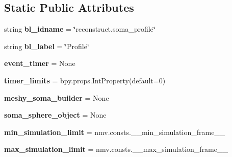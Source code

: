 \subsection*{Static Public Attributes}
\begin{DoxyCompactItemize}
\item 
string {\bfseries bl\+\_\+idname} = \char`\"{}reconstruct.\+soma\+\_\+profile\char`\"{}\hypertarget{classui__soft__body__panel_1_1ReconstructSomaProfile_a96e245e3b980b5d0f45db69df75bc9a7}{}\label{classui__soft__body__panel_1_1ReconstructSomaProfile_a96e245e3b980b5d0f45db69df75bc9a7}

\item 
string {\bfseries bl\+\_\+label} = \char`\"{}Profile\char`\"{}\hypertarget{classui__soft__body__panel_1_1ReconstructSomaProfile_ae5d9a1cb040df4826904c44fd276bf5f}{}\label{classui__soft__body__panel_1_1ReconstructSomaProfile_ae5d9a1cb040df4826904c44fd276bf5f}

\item 
{\bfseries event\+\_\+timer} = None\hypertarget{classui__soft__body__panel_1_1ReconstructSomaProfile_ae50a7f97e9bf86df3853a387cab031e6}{}\label{classui__soft__body__panel_1_1ReconstructSomaProfile_ae50a7f97e9bf86df3853a387cab031e6}

\item 
{\bfseries timer\+\_\+limits} = bpy.\+props.\+Int\+Property(default=0)\hypertarget{classui__soft__body__panel_1_1ReconstructSomaProfile_a1279d0aa730c1a5207c87ef6f68d97c1}{}\label{classui__soft__body__panel_1_1ReconstructSomaProfile_a1279d0aa730c1a5207c87ef6f68d97c1}

\item 
{\bfseries meshy\+\_\+soma\+\_\+builder} = None\hypertarget{classui__soft__body__panel_1_1ReconstructSomaProfile_aad5cdeed55ee9868a31d4f3d24906383}{}\label{classui__soft__body__panel_1_1ReconstructSomaProfile_aad5cdeed55ee9868a31d4f3d24906383}

\item 
{\bfseries soma\+\_\+sphere\+\_\+object} = None\hypertarget{classui__soft__body__panel_1_1ReconstructSomaProfile_affc179f15dde0932128f981f9d7d2065}{}\label{classui__soft__body__panel_1_1ReconstructSomaProfile_affc179f15dde0932128f981f9d7d2065}

\item 
{\bfseries min\+\_\+simulation\+\_\+limit} = nmv.\+consts.\+\_\+\+\_\+min\+\_\+simulation\+\_\+frame\+\_\+\+\_\+\hypertarget{classui__soft__body__panel_1_1ReconstructSomaProfile_a99697c53891bf9f93f702af21bb8cc90}{}\label{classui__soft__body__panel_1_1ReconstructSomaProfile_a99697c53891bf9f93f702af21bb8cc90}

\item 
{\bfseries max\+\_\+simulation\+\_\+limit} = nmv.\+consts.\+\_\+\+\_\+max\+\_\+simulation\+\_\+frame\+\_\+\+\_\+\hypertarget{classui__soft__body__panel_1_1ReconstructSomaProfile_a4a3c89405bbd882eee08ffbc3ea5f61a}{}\label{classui__soft__body__panel_1_1ReconstructSomaProfile_a4a3c89405bbd882eee08ffbc3ea5f61a}

\end{DoxyCompactItemize}



